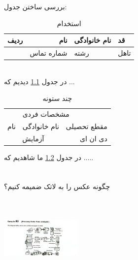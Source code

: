 \documentclass{book}
\author{علی}
\begin{document}
	\maketitle
	\tableofcontents
	\singlespacing
	\Time
\chapter{}	
\BNaz
بررسی ساختن جدول:
\begin{table}[h!]

\begin{center}
 \begin{tabular}{|c|r|p{2cm}||l|}
	\hline
	ردیف &
	\textbf{نام} &
	\centering
	 نام خانوادگی & قد \\
	\hline
	&
شماره تماس &
\centering
 رشته & تاهل\\
	\hline
 \end{tabular}
\end{center}
\caption{استخدام}
\label{Tab1}
\end{table}
\\
	در جدول \ref{Tab1} دیدیم که ...
	
\begin{table}[h!]
	\begin{center}
		\begin{tabular}{|c|c|r|}
			\hline
			&
			\multicolumn{2}{|l|}{مشخصات فردی} \\
			\cline{1-3}

نام & نام خانوادگی & مقطع تحصیلی 
\\
\hline
\multicolumn{2}{|c|}{آزمایش} 
&
دی ان ای \\
\hline
		\end{tabular}
	\end{center}
\caption{چند ستونه}
\label{Tab2}
\end{table}
در جدول \ref{Tab2}
ما شاهدیم که .....
\chapter{}
چگونه عکس را به لاتک ضمیمه کنیم؟
\\
\includegraphics[width=4cm, height=5cm]{Capture.PNG}
\end{document}
